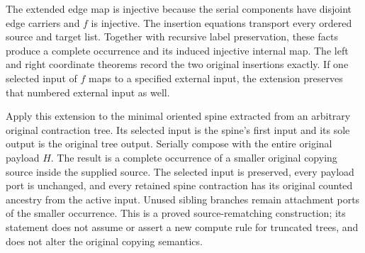 



The extended edge map is injective because the serial components have
disjoint edge carriers and $f$ is injective. The insertion equations
transport every ordered source and target list. Together with recursive
label preservation, these facts produce a complete occurrence and its
induced injective internal map. The left and right coordinate theorems
record the two original insertions exactly. If one selected input of $f$
maps to a specified external input, the extension preserves that numbered
external input as well.





\par{}

Apply this extension to the minimal oriented spine extracted from an
arbitrary original contraction tree. Its selected input is the spine's
first input and its sole output is the original tree output. Serially
compose with the entire original payload $H$. The result is a complete
occurrence of a smaller original copying source inside the supplied
source. The selected input is preserved, every payload port is unchanged,
and every retained spine contraction has its original counted ancestry
from the active input. Unused sibling branches remain attachment ports of
the smaller occurrence. This is a proved source-rematching construction;
its statement does not assume or assert a new compute rule for truncated
trees, and does not alter the original copying semantics.


